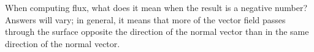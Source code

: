 {When computing flux, what does it mean when the result is a negative number?
}
{Answers will vary; in general, it means that more of the vector field passes through the surface opposite the direction of the normal vector than in the same direction of the normal vector.
}
